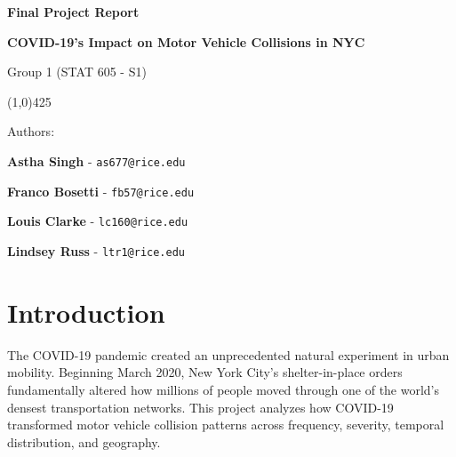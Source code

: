 \documentclass[10pt]{article}\usepackage[]{graphicx}\usepackage[]{xcolor}
\begin{document}
\begin{titlepage}
    \centering
    
    { \Huge \textbf{Final Project Report} \par} 
    \vspace{5mm}
    { \huge \textbf{COVID-19's Impact on Motor Vehicle Collisions in NYC} \par} 
    \vspace{3mm}
    { \Large Group 1 (STAT 605 - S1)\par}  
    
    \vspace{5mm}
    \begin{center}
    \line(1,0){425}
    \end{center}
    
    \vspace{5mm}

    \vspace{15mm}
    { \large Authors: \par }
      \vspace{3mm}
    { \Large \textbf{Astha Singh} - \texttt{as677@rice.edu} \par}
    { \Large \textbf{Franco Bosetti} - \texttt{fb57@rice.edu}\par}
    { \Large \textbf{Louis Clarke} - \texttt{lc160@rice.edu}\par}
    { \Large \textbf{Lindsey Russ} - \texttt{ltr1@rice.edu}\par}
    
    
    \vspace{5mm}
    
    \vspace{5mm}

\end{titlepage}

\newpage


\tableofcontents

\newpage

\section{Introduction}

The COVID-19 pandemic created an unprecedented natural experiment in urban mobility. Beginning March 2020, New York City's shelter-in-place orders fundamentally altered how millions of people moved through one of the world's densest transportation networks. This project analyzes how COVID-19 transformed motor vehicle collision patterns across frequency, severity, temporal distribution, and geography.
\end{document}
